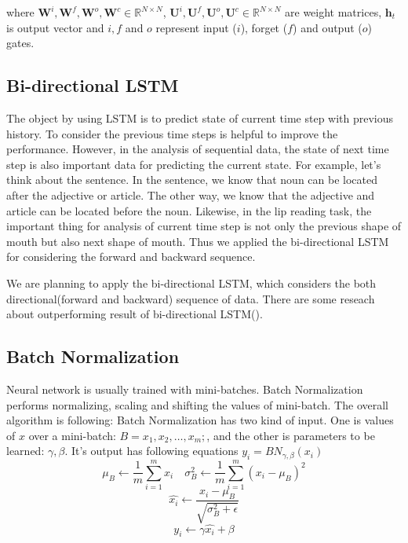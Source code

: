 where $\mathbf{W}^i, \mathbf{W}^f, \mathbf{W}^o, \mathbf{W}^c \in \mathbb{R}^{N \times N}$, $\mathbf{U}^i, \mathbf{U}^f, \mathbf{U}^o, \mathbf{U}^c \in \mathbb{R}^{N \times N}$ are weight matrices, $\mathbf h_t$ is output vector and $i, f$ and $o$ represent input ($i$), forget ($f$) and output ($o$) gates.

\subsection{Bi-directional LSTM}

The object by using LSTM is to predict state of current time step with previous history. To consider the previous time steps is helpful to improve the performance. However, in the analysis of sequential data, the state of next time step is also important data for predicting the current state. For example, let’s think about the sentence. In the sentence, we know that noun can be located after the adjective or article. The other way, we know that the adjective and article can be located before the noun. Likewise, in the lip reading task, the important thing for analysis of current time step is not only the previous shape of mouth but also next shape of mouth. Thus we applied the bi-directional LSTM for considering the forward and backward sequence. 


We are planning to apply the bi-directional LSTM, which considers the both directional(forward and backward) sequence of data. There are some reseach about outperforming result of bi-directional LSTM(\cite{BiLSTM}). 


\subsection{Batch Normalization}
Neural network is usually trained with mini-batches. Batch Normalization performs normalizing, scaling and shifting the values of mini-batch. The overall algorithm is following: Batch Normalization has two kind of input. One is values of $x$ over a mini-batch: $B = {x_1,x_2,\dots,x_m};$, and the other is parameters to be learned: $\gamma, \beta$. It's output has following equations ${y_i = BN_{\gamma,\beta}(x_i)}$\\
$$ \mu_B \leftarrow \frac{1}{m}\sum_{i=1}^{m}x_i   \quad   \sigma^2_B \leftarrow \frac{1}{m}\sum_{i=1}^{m}(x_i-\mu_B)^2$$
$$\hat{x_i} \leftarrow \frac{x_i - \mu_B}{\sqrt{\sigma^2_B + \epsilon}}$$
$$y_i \leftarrow \gamma\hat{x_i} + \beta $$



